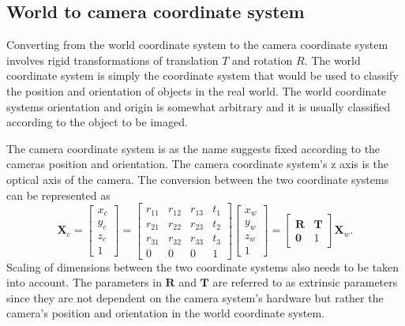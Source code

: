 \subsection{World to camera coordinate system}
Converting from the world coordinate system to the camera coordinate system involves rigid transformations of translation $T$ and rotation $R$. The world coordinate system is simply the coordinate system that would be used to classify the position and orientation of objects in the real world. The world coordinate systems orientation and origin is somewhat arbitrary and it is usually classified according to the object to be imaged. 

The camera coordinate system is as the name suggests fixed according to the cameras position and orientation. The camera coordinate system's z axis is the optical axis of the camera. The conversion between the two coordinate systems can be represented as
\begin{equation}
	\bm{X}_c = 
	\begin{bmatrix}
	x_c \\
	y_c \\
	z_c \\
	1
	\end{bmatrix}
	=
	\begin{bmatrix}
	r_{11} & r_{12} & r_{13} & t_1 \\
	r_{21} & r_{22} & r_{23} & t_2 \\
	r_{31} & r_{32} & r_{33} & t_3 \\
	0 & 0 & 0 & 1
	\end{bmatrix}
	\begin{bmatrix}
	x_w \\
	y_w \\
	z_w \\
	1
	\end{bmatrix} = 
	\begin{bmatrix}
	\bm{R} & \bm{T} \\
	\bm{0} & 1
	\end{bmatrix} \bm{X}_w.
\end{equation}
Scaling of dimensions between the two coordinate systems also needs to be taken into account. The parameters in $\bm{R}$ and $\bm{T}$ are referred to as extrinsic parameters since they are not dependent on the camera system's hardware but rather the camera's position and orientation in the world coordinate system.


